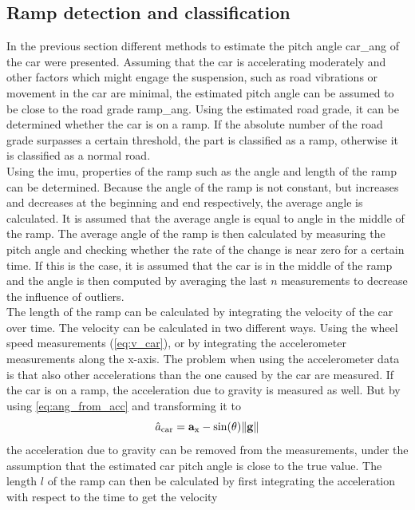 \subsection{Ramp detection and classification}
\label{ssec:ramp_detection_imu}
In the previous section different methods to estimate the pitch angle \gls{car_ang} of the car were presented.
Assuming that the car is accelerating moderately and other factors which might engage the suspension, such as road vibrations or movement in the car are minimal, the estimated pitch angle can be assumed to be close to the road grade \gls{ramp_ang}.
Using the estimated road grade, it can be determined whether the car is on a ramp.
If the absolute number of the road grade surpasses a certain threshold, the part is classified as a ramp, otherwise it is classified as a normal road.\\
Using the \gls{imu}, properties of the ramp such as the angle and length of the ramp can be determined.
Because the angle of the ramp is not constant, but increases and decreases at the beginning and end respectively, the average angle is calculated.
It is assumed that the average angle is equal to angle in the middle of the ramp.
The average angle of the ramp is then calculated by measuring the pitch angle and checking whether the rate of the change is near zero for a certain time.
If this is the case, it is assumed that the car is in the middle of the ramp and the angle is then computed by averaging the last $n$ measurements to decrease the influence of outliers.\\
The length of the ramp can be calculated by integrating the velocity of the car over time.
The velocity can be calculated in two different ways.
Using the wheel speed measurements (\cref{eq:v_car}), or by integrating the accelerometer measurements along the x-axis.
The problem when using the accelerometer data is that also other accelerations than the one caused by the car are measured.
If the car is on a ramp, the acceleration due to gravity is measured as well.
But by using \cref{eq:ang_from_acc} and transforming it to
\begin{equation}
	\label{eq:acc_from_imu_wo_grav}
	\hat{a}_\mathrm{car} = \vb{a}_\mathrm{x} - \sin(\theta) \norm{\vb{g}}
\end{equation}
the acceleration due to gravity can be removed from the measurements, under the assumption that the estimated car pitch angle is close to the true value.
The length $l$ of the ramp can then be calculated by first integrating the acceleration with respect to the time to get the velocity
